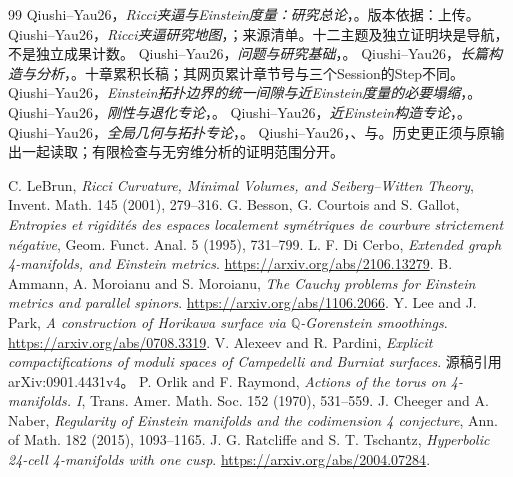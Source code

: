 \documentclass[UTF8,fontset=fandol,zihao=-4]{ctexart}
\theoremstyle{research}
\numberwithin{equation}{section}
\begin{document}
\begingroup\small
\begin{thebibliography}{99}
\setlength{\itemsep}{2pt}\setlength{\parskip}{0pt}\setlength{\parsep}{0pt}
 Qiushi--Yau26，\emph{Ricci夹逼与Einstein度量：研究总论}，。版本依据：上传。
 Qiushi--Yau26，\emph{Ricci夹逼研究地图}，；来源清单。十二主题及独立证明块是导航，不是独立成果计数。
 Qiushi--Yau26，\emph{问题与研究基础}，。
 Qiushi--Yau26，\emph{长篇构造与分析}，。十章累积长稿；其网页累计章节号与三个Session的Step不同。
 Qiushi--Yau26，\emph{Einstein拓扑边界的统一间隙与近Einstein度量的必要塌缩}，。
 Qiushi--Yau26，\emph{刚性与退化专论}，。
 Qiushi--Yau26，\emph{近Einstein构造专论}，。
 Qiushi--Yau26，\emph{全局几何与拓扑专论}，。
 Qiushi--Yau26，、与。历史更正须与原输出一起读取；有限检查与无穷维分析的证明范围分开。

 C. LeBrun, \emph{Ricci Curvature, Minimal Volumes, and Seiberg--Witten Theory}, Invent. Math. 145 (2001), 279--316.
 G. Besson, G. Courtois and S. Gallot, \emph{Entropies et rigidités des espaces localement symétriques de courbure strictement négative}, Geom. Funct. Anal. 5 (1995), 731--799.
 L. F. Di Cerbo, \emph{Extended graph 4-manifolds, and Einstein metrics}. \url{https://arxiv.org/abs/2106.13279}.
 B. Ammann, A. Moroianu and S. Moroianu, \emph{The Cauchy problems for Einstein metrics and parallel spinors}. \url{https://arxiv.org/abs/1106.2066}.
 Y. Lee and J. Park, \emph{A construction of Horikawa surface via $\mathbb Q$-Gorenstein smoothings}. \url{https://arxiv.org/abs/0708.3319}.
 V. Alexeev and R. Pardini, \emph{Explicit compactifications of moduli spaces of Campedelli and Burniat surfaces}. 源稿引用arXiv:0901.4431v4。
 P. Orlik and F. Raymond, \emph{Actions of the torus on 4-manifolds. I}, Trans. Amer. Math. Soc. 152 (1970), 531--559.
 J. Cheeger and A. Naber, \emph{Regularity of Einstein manifolds and the codimension 4 conjecture}, Ann. of Math. 182 (2015), 1093--1165.
 J. G. Ratcliffe and S. T. Tschantz, \emph{Hyperbolic 24-cell 4-manifolds with one cusp}. \url{https://arxiv.org/abs/2004.07284}.

\end{thebibliography}
\endgroup
\end{document}
